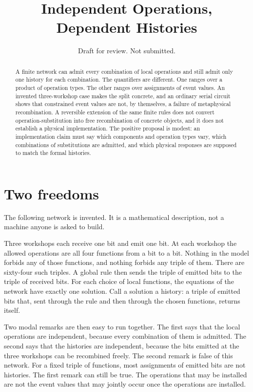 \documentclass[12pt]{article}
\title{Independent Operations, Dependent Histories}
\author{}
\date{Draft for review. Not submitted.}
\begin{document}
\maketitle

\begin{abstract}
A finite network can admit every combination of local operations and still admit only one history for each combination. The quantifiers are different. One ranges over a product of operation types. The other ranges over assignments of event values. An invented three-workshop case makes the split concrete, and an ordinary serial circuit shows that constrained event values are not, by themselves, a failure of metaphysical recombination. A reversible extension of the same finite rules does not convert operation-substitution into free recombination of concrete objects, and it does not establish a physical implementation. The positive proposal is modest: an implementation claim must say which components and operation types vary, which combinations of substitutions are admitted, and which physical responses are supposed to match the formal histories.
\end{abstract}

\section{Two freedoms}
\label{sec:two}

The following network is invented. It is a mathematical description, not a machine anyone is asked to build.

Three workshops each receive one bit and emit one bit. At each workshop the allowed operations are all four functions from a bit to a bit. Nothing in the model forbids any of those functions, and nothing forbids any triple of them. There are sixty-four such triples. A global rule then sends the triple of emitted bits to the triple of received bits. For each choice of local functions, the equations of the network have exactly one solution. Call a solution a history: a triple of emitted bits that, sent through the rule and then through the chosen functions, returns itself.

Two modal remarks are then easy to run together. The first says that the local operations are independent, because every combination of them is admitted. The second says that the histories are independent, because the bits emitted at the three workshops can be recombined freely. The second remark is false of this network. For a fixed triple of functions, most assignments of emitted bits are not histories. The first remark can still be true. The operations that may be installed are not the event values that may jointly occur once the operations are installed.
\end{document}
